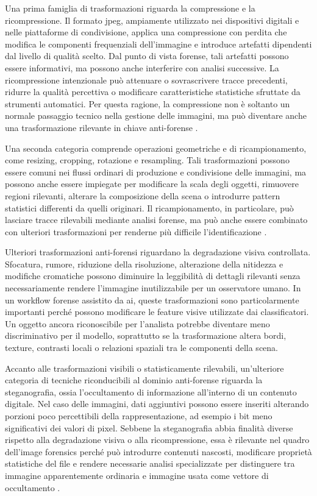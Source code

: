 Una prima famiglia di trasformazioni riguarda la compressione e la ricompressione. Il formato \gls{jpeg}, ampiamente utilizzato nei dispositivi digitali e nelle piattaforme di condivisione, applica una compressione con perdita che modifica le componenti frequenziali dell'immagine e introduce artefatti dipendenti dal livello di qualità scelto. Dal punto di vista forense, tali artefatti possono essere informativi, ma possono anche interferire con analisi successive. La ricompressione intenzionale può attenuare o sovrascrivere tracce precedenti, ridurre la qualità percettiva o modificare caratteristiche statistiche sfruttate da strumenti automatici. Per questa ragione, la compressione non è soltanto un normale passaggio tecnico nella gestione delle immagini, ma può diventare anche una trasformazione rilevante in chiave anti-forense \cite{stamm2010anti,stamm2013information}.

Una seconda categoria comprende operazioni geometriche e di ricampionamento, come resizing, cropping, rotazione e resampling. Tali trasformazioni possono essere comuni nei flussi ordinari di produzione e condivisione delle immagini, ma possono anche essere impiegate per modificare la scala degli oggetti, rimuovere regioni rilevanti, alterare la composizione della scena o introdurre pattern statistici differenti da quelli originari. Il ricampionamento, in particolare, può lasciare tracce rilevabili mediante analisi forense, ma può anche essere combinato con ulteriori trasformazioni per renderne più difficile l'identificazione \cite{popescu2005exposing,farid2016photo}.

Ulteriori trasformazioni anti-forensi riguardano la degradazione visiva controllata. Sfocatura, rumore, riduzione della risoluzione, alterazione della nitidezza e modifiche cromatiche possono diminuire la leggibilità di dettagli rilevanti senza necessariamente rendere l'immagine inutilizzabile per un osservatore umano. In un workflow forense assistito da \gls{ai}, queste trasformazioni sono particolarmente importanti perché possono modificare le feature visive utilizzate dai classificatori. Un oggetto ancora riconoscibile per l'analista potrebbe diventare meno discriminativo per il modello, soprattutto se la trasformazione altera bordi, texture, contrasti locali o relazioni spaziali tra le componenti della scena.

Accanto alle trasformazioni visibili o statisticamente rilevabili, un'ulteriore categoria di tecniche riconducibili al dominio anti-forense riguarda la steganografia, ossia l'occultamento di informazione all'interno di un contenuto digitale. Nel caso delle immagini, dati aggiuntivi possono essere inseriti alterando porzioni poco percettibili della rappresentazione, ad esempio i bit meno significativi dei valori di pixel. Sebbene la steganografia abbia finalità diverse rispetto alla degradazione visiva o alla ricompressione, essa è rilevante nel quadro dell'image forensics perché può introdurre contenuti nascosti, modificare proprietà statistiche del file e rendere necessarie analisi specializzate per distinguere tra immagine apparentemente ordinaria e immagine usata come vettore di occultamento \cite{stamm2013information,yaacoub2021digital}.

